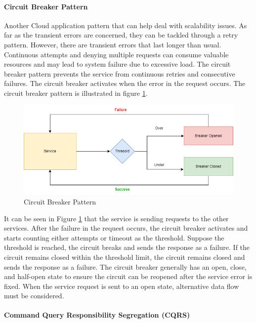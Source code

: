 \documentclass[12pt,a4paper]{article}
\begin{document}
\paragraph{Circuit Breaker Pattern}

Another Cloud application pattern that can help deal with scalability issues. As far as the transient errors are concerned, they can be tackled through a retry pattern. However, there are transient errors that last longer than usual. Continuous attempts and denying multiple requests can consume valuable resources and may lead to system failure due to excessive load. The circuit breaker pattern prevents the service from continuous retries and consecutive failures. The circuit breaker activates when the error in the request occurs. The circuit breaker pattern is illustrated in figure \ref{circuit_breaker}. \cite{r25}

\begin{figure}[H]
\centering
\includegraphics[scale=0.5]{circuit_breaker.PNG}
\caption{Circuit Breaker Pattern \cite{r26}}
\label{circuit_breaker}
\end{figure}

It can be seen in Figure \ref{circuit_breaker} that the service is sending requests to the other services. After the failure in the request occurs, the circuit breaker activates and starts counting either attempts or timeout as the threshold. Suppose the threshold is reached, the circuit breaks and sends the response as a failure. If the circuit remains closed within the threshold limit, the circuit remains closed and sends the response as a failure. The circuit breaker generally has an open, close, and half-open state to ensure the circuit can be reopened after the service error is fixed. When the service request is sent to an open state, alternative data flow must be considered. \cite{r25}


\paragraph{Command Query Responsibility Segregation (CQRS)}
\end{document}
